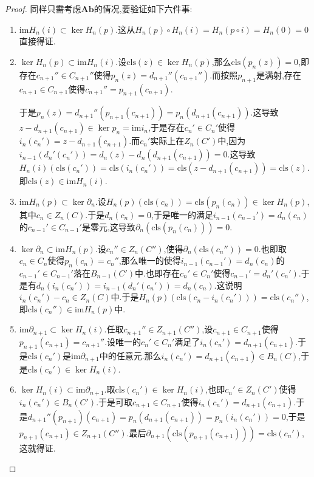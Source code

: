\begin{enumerate}
\begin{proof}
		同样只需考虑$\textbf{Ab}$的情况,要验证如下六件事:
		\begin{enumerate}
			\item $\mathrm{im}H_n(i)\subset\ker H_n(p)$.这从$H_n(p)\circ H_n(i)=H_n(p\circ i)=H_n(0)=0$直接得证.
			\item $\ker H_n(p)\subset\mathrm{im}H_n(i)$.设$\mathrm{cls}(z)\in\ker H_n(p)$,那么$\mathrm{cls}(p_n(z))=0$,即存在$c_{n+1}''\in C_{n+1}''$使得$p_n(z)=d_{n+1}''(c_{n+1}'')$.而按照$p_{n+1}$是满射,存在$c_{n+1}\in C_{n+1}$使得$c_{n+1}''=p_{n+1}(c_{n+1})$.
			
			于是$p_n(z)=d_{n+1}''(p_{n+1}(c_{n+1}))=p_n(d_{n+1}(c_{n+1}))$.这导致$z-d_{n+1}(c_{n+1})\in\ker p_n=\mathrm{im}i_n$,于是存在$c_n'\in C_n'$使得$i_n(c_n')=z-d_{n+1}(c_{n+1})$.而$c_n'$实际上在$Z_n(C')$中,因为$i_{n-1}(d_n'(c_n'))=d_n(z)-d_n(d_{n+1}(c_{n+1}))=0$.这导致$H_n(i)(\mathrm{cls}(c_n'))=\mathrm{cls}(i_n(c_n'))=\mathrm{cls}(z-d_{n+1}(c_{n+1}))=\mathrm{cls}(z)$.即$\mathrm{cls}(z)\in\mathrm{im}H_n(i)$.
			\item $\mathrm{im}H_n(p)\subset\ker\partial_n$.设$H_n(p)(\mathrm{cls}(c_n))=\mathrm{cls}(p_n(c_n))\in\ker H_n(p)$,其中$c_n\in Z_n(C)$.于是$d_n(c_n)=0$,于是唯一的满足$i_{n-1}(c_{n-1}')=d_n(c_n)$的$c_{n-1}'\in C_{n-1}'$是零元,这导致$\partial_n(\mathrm{cls}(p_n(c_n)))=0$.
			\item $\ker\partial_n\subset\mathrm{im}H_n(p)$.设$c_n''\in Z_n(C'')$,使得$\partial_n(\mathrm{cls}(c_n''))=0$.也即取$c_n\in C_n$使得$p_n(c_n)=c_n''$,那么唯一的使得$i_{n-1}(c_{n-1}')=d_n(c_n)$的$c_{n-1}'\in C_{n-1}'$落在$B_{n-1}(C')$中.也即存在$c_n'\in C_n'$使得$c_{n-1}'=d_n'(c_n')$.于是有$d_n(i_n(c_n'))=i_{n-1}(d_n'(c_n'))=d_n(c_n)$.这说明$i_n(c_n')-c_n\in Z_n(C)$中.于是$H_n(p)(\mathrm{cls}(c_n-i_n(c_n')))=\mathrm{cls}(c_n'')$,即$\mathrm{cls}(c_n'')\in\mathrm{im}H_n(p)$中.
			\item $\mathrm{im}\partial_{n+1}\subset\ker H_n(i)$.任取$c_{n+1}''\in Z_{n+1}(C'')$,设$c_{n+1}\in C_{n+1}$使得$p_{n+1}(c_{n+1})=c_{n+1}''$.设唯一的$c_n'\in C_n'$满足了$i_n(c_n')=d_{n+1}(c_{n+1})$.于是$\mathrm{cls}(c_n')$是$\mathrm{im}\partial_{n+1}$中的任意元.那么$i_n(c_n')=d_{n+1}(c_{n+1})\in B_n(C)$,于是$\mathrm{cls}(c_n')\in\ker H_n(i)$.
			\item $\ker H_n(i)\subset\mathrm{im}\partial_{n+1}$.取$\mathrm{cls}(c_n')\in\ker H_n(i)$,也即$c_n'\in Z_n(C')$使得$i_n(c_n')\in B_n(C')$.于是可取$c_{n+1}\in C_{n+1}$使得$i_n(c_n')=d_{n+1}(c_{n+1})$.于是$d_{n+1}''(p_{n+1})(c_{n+1})=p_n(d_{n+1}(c_{n+1}))=p_n(i_n(c_n'))=0$,于是$p_{n+1}(c_{n+1})\in Z_{n+1}(C'')$.最后$\partial_{n+1}(\mathrm{cls}(p_{n+1}(c_{n+1})))=\mathrm{cls}(c_n')$,这就得证.

\end{enumerate}
\end{proof}
\end{enumerate}
